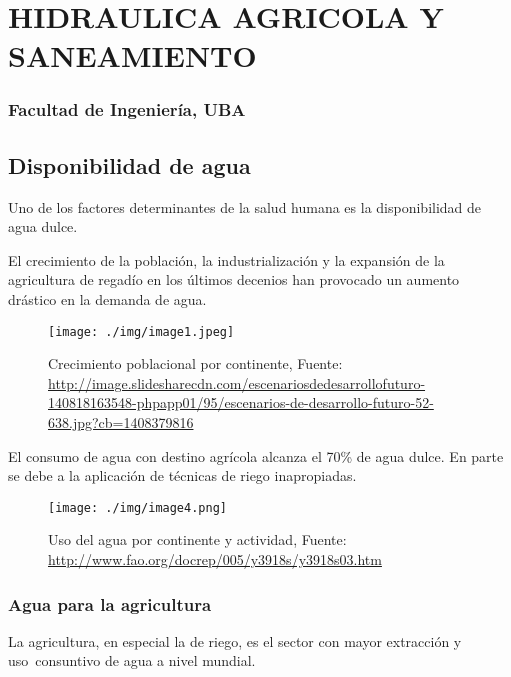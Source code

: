 \documentclass[
  a4paper,12pt]{extarticle}
\author{}
\date{}
\begin{document}
\hypertarget{hidraulica-agricola-y-saneamiento}{%
\section{HIDRAULICA AGRICOLA Y
SANEAMIENTO}\label{hidraulica-agricola-y-saneamiento}}

\hypertarget{facultad-de-ingenieruxeda-uba}{%
\subsubsection{Facultad de Ingeniería,
UBA}\label{facultad-de-ingenieruxeda-uba}}

\hypertarget{disponibilidad-de-agua}{%
\subsection{Disponibilidad de agua}\label{disponibilidad-de-agua}}

Uno de los factores determinantes de la salud humana es la
disponibilidad de agua dulce.

El crecimiento de la población, la industrialización y la expansión de
la agricultura de regadío en los últimos decenios han provocado un
aumento drástico en la demanda de agua.

\begin{figure}
\centering
\texttt{[image: ./img/image1.jpeg]}
\caption{Crecimiento poblacional por continente, \small Fuente:
\url{http://image.slidesharecdn.com/escenariosdedesarrollofuturo-140818163548-phpapp01/95/escenarios-de-desarrollo-futuro-52-638.jpg?cb=1408379816}}
\end{figure}

El consumo de agua con destino agrícola alcanza el 70\% de agua dulce.
En parte se debe a la aplicación de técnicas de riego inapropiadas.

\begin{figure}
\centering
\texttt{[image: ./img/image4.png]}
\caption{Uso del agua por continente y actividad, Fuente:
\url{http://www.fao.org/docrep/005/y3918s/y3918s03.htm}}
\end{figure}

\hypertarget{agua-para-la-agricultura}{%
\subsubsection{Agua para la
agricultura}\label{agua-para-la-agricultura}}

La agricultura, en especial la de riego, es el sector con mayor
extracción y uso~consuntivo de agua a nivel mundial.
\end{document}
